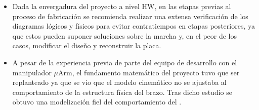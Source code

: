 \begin{itemize}
    \item Dada la envergadura del proyecto a nivel \ac{HW}, en las etapas previas al proceso de fabricación se recomienda realizar una extensa verificación de los diagramas lógicos y físicos para evitar contratiempos en etapas posteriores, ya que estos pueden suponer soluciones sobre la marcha y, en el peor de los casos, modificar el diseño y reconstruir la placa.
    \item A pesar de la experiencia previa de parte del equipo de desarrollo con el manipulador $\mu$Arm, el fundamento matemático del proyecto tuvo que ser replanteado ya que se vio que el modelo cinemático no se ajustaba al comportamiento de la estructura física del brazo. Tras dicho estudio se obtuvo una modelización fiel del comportamiento del \pArm.
\end{itemize}